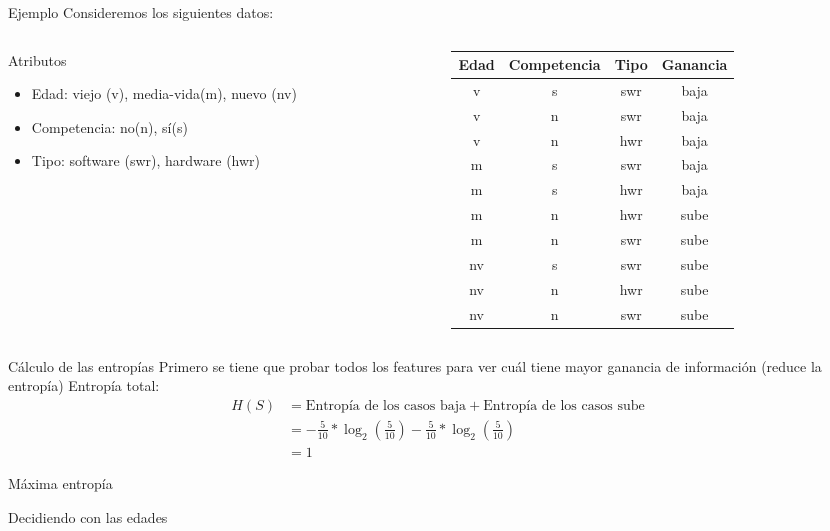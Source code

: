 \documentclass[aspectratio=169]{beamer}
\begin{document}
%
\begin{frame}{Ejemplo}
	Consideremos los siguientes datos:
	\begin{columns}
		\begin{column}{0.5\columnwidth}
			Atributos
			\begin{itemize}
				\item Edad: viejo (v), media-vida(m), nuevo (nv)
				\item Competencia: no(n), sí(s)
				\item Tipo: software (swr), hardware (hwr)
			\end{itemize}
		\end{column}
		\begin{column}{0.5\columnwidth}
			\begin{tabular}{cccc}
				Edad	&  Competencia & Tipo	& Ganancia\\
				\hline
				v	& s & swr & baja\\
				v	& n & swr & baja\\
				v	& n & hwr & baja\\
				m	& s & swr & baja\\
				m	& s & hwr & baja\\
				m	& n & hwr & sube\\
				m	& n & swr & sube\\
				nv	& s & swr & sube\\
				nv	& n & hwr & sube\\
				nv	& n & swr & sube\\
				\hline
			\end{tabular}
		\end{column}
	\end{columns}
\end{frame}
%
\begin{frame}{Cálculo de las entropías}
	Primero se tiene que probar todos los features para ver cuál tiene mayor ganancia de información (reduce la entropía)
	Entropía total:
	\begin{align*}
		H(S) 	&= \text{Entropía de los casos baja} + \text{Entropía de los casos sube}\\
				&= -\frac{5}{10}*\log_2(\frac{5}{10}) - \frac{5}{10}*\log_2(\frac{5}{10})\\
				&= 1
	\end{align*}
	\begin{center}
		Máxima entropía
	\end{center}
\end{frame}
%
\begin{frame}{Decidiendo con las edades}
	\begin{center}
		
	\end{center}
\end{frame}
\end{document}
